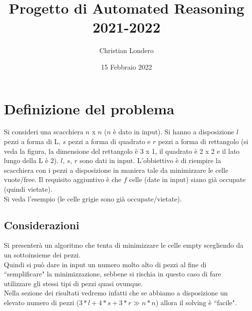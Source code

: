 \documentclass{article}
\title{Progetto di Automated Reasoning\\2021-2022}
\author{ Christian Londero }
\date{15 Febbraio 2022}
\begin{document}
\maketitle

\section{Definizione del problema}
Si consideri una scacchiera $n$ x $n$ ($n$ è dato in input). Si hanno a disposizione $l$ pezzi a forma di L, $s$ pezzi a forma di quadrato e $r$ pezzi a forma di rettangolo (si veda la figura, la dimensione del rettangolo è 3 x 1, il quadrato è 2 x 2 e il lato lungo della L è 2). $l$, $s$, $r$ sono dati in input. L'obbiettivo è di riempire la scacchiera con i pezzi a disposizione in maniera tale da minimizzare le celle vuote/free. Il requisito aggiuntivo è che $f$ celle (date in input) siano già occupate (quindi vietate).\\
Si veda l'esempio (le celle grigie sono già occupate/vietate).

\subsection{Considerazioni}
Si presenterà un algoritmo che tenta di minimizzare le celle empty scegliendo da un sottoinsieme dei pezzi. \\
Quindi si può dare in input un numero molto alto di pezzi al fine di ``semplificare" la minimizzazione, sebbene si rischia in questo caso di fare utilizzare gli stessi tipi di pezzi quasi ovunque.\\
Nella sezione dei risultati vedremo infatti che se abbiamo a disposizione un elevato numero di pezzi ($3*l + 4*s + 3*r \gg n*n$) allora il solving è ``facile".
\end{document}
